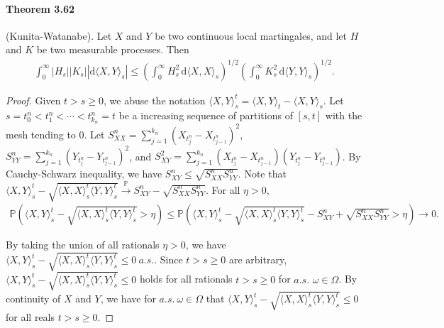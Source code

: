 \documentclass{article}
\numberwithin{equation}{section}
\renewcommand{\P}{\mathbb{P}}
\renewcommand{\d}{\mathrm{d}}
\theoremstyle{plain}
\theoremstyle{definition}
\begin{document}
\paragraph{Theorem 3.62\label{thm:3.62}} (Kunita-Watanabe). Let $X$ and $Y$ be two continuous local martingales, and let $H$ and $K$ be two measurable processes. Then
\begin{align*}
	\int_0^\infty\left\vert H_s\right\vert\left\vert K_s\right\vert\left\vert\d\langle X,Y\rangle_s\right\vert\leq\left(\int_0^\infty H_s^2\,\d \langle X,X\rangle_s\right)^{1/2}\left(\int_0^\infty K_s^2\,\d \langle Y,Y\rangle_s\right)^{1/2}.
\end{align*}
\begin{proof}
Given $t>s\geq 0$, we abuse the notation $\langle X,Y\rangle_s^t = \langle X,Y\rangle_t-\langle X,Y\rangle_s$. Let $s=t_0^n<t_1^n<\cdots<t_{k_n}^n=t$ be a increasing sequence of partitions of $[s,t]$ with the mesh tending to $0$. Let $S_{XX}^n=\sum_{j=1}^{k_n}\left(X_{t_j^n} - X_{t_{j-1}^n}\right)^2$, $S_{YY}^n=\sum_{j=1}^{k_n}\left(Y_{t_j^n} - Y_{t_{j-1}^n}\right)^2$, and $S_{XY}^2=\sum_{j=1}^{k_n}\left(X_{t_j^n} - X_{t_{j-1}^n}\right)\left(Y_{t_j^n} - Y_{t_{j-1}^n}\right)$. By Cauchy-Schwarz inequality, we have $S_{XY}^n\leq\sqrt{S_{XX}^nS_{YY}^n}$. Note that $\langle X,Y\rangle_s^t - \sqrt{\langle X,X\rangle_s^t\langle Y,Y\rangle_s^t}\overset{\P}{\to}S_{XY}^n-\sqrt{S_{XX}^nS_{YY}^n}$. For all $\eta>0$,
\begin{align*}
	\P\left(\langle X,Y\rangle_s^t - \sqrt{\langle X,X\rangle_s^t\langle Y,Y\rangle_s^t} > \eta\right)\leq\P\left(\langle X,Y\rangle_s^t - \sqrt{\langle X,X\rangle_s^t\langle Y,Y\rangle_s^t} - S_{XY}^n + \sqrt{S_{XX}^nS_{YY}^n}> \eta\right)\to 0.
\end{align*}

By taking the union of all rationals $\eta>0$, we have $\langle X,Y\rangle_s^t - \sqrt{\langle X,X\rangle_s^t\langle Y,Y\rangle_s^t}\leq 0\ a.s.$. Since $t>s\geq 0$ are arbitrary, $\langle X,Y\rangle_s^t - \sqrt{\langle X,X\rangle_s^t\langle Y,Y\rangle_s^t}\leq 0$ holds for all rationals $t>s\geq 0$ for $a.s.$ $\omega\in\Omega$. By continuity of $X$ and $Y$, we have for $a.s.\ \omega\in\Omega$ that $\langle X,Y\rangle_s^t - \sqrt{\langle X,X\rangle_s^t\langle Y,Y\rangle_s^t}\leq 0$ for all reals $t>s\geq 0$.


\end{proof}
\end{document}
